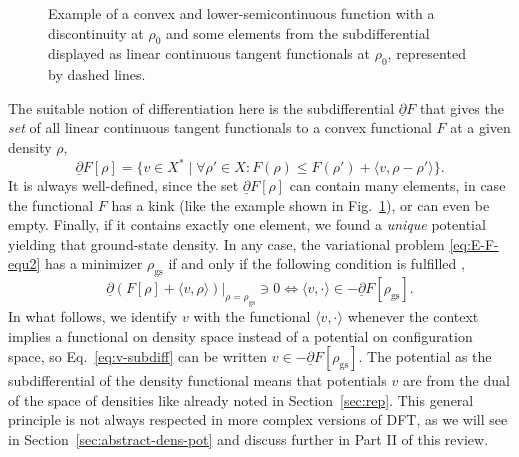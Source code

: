 \documentclass[journal=apcach,manuscript=article,layout=twocolumn]{achemso}
\newcommand{\rhogs}{{\rho_\mathrm{gs}}}
\begin{document}
\begin{figure}[ht]
\centering
{}
\caption{Example of a convex and lower-semicontinuous function with a discontinuity at $\rho_0$ and some elements from the subdifferential displayed as linear continuous tangent functionals at $\rho_0$, represented by dashed lines.}
\label{fig:subdiff}
\end{figure}

The suitable notion of differentiation here is the subdifferential $\underline\partial F$ that gives the \emph{set} of all linear continuous tangent functionals to a convex functional $F$ at a given density $\rho$,
\begin{equation*}
    \underline\partial F[\rho] = \{ v\in X^* \mid \forall \rho' \in X : F(\rho) \leq F(\rho')+ \langle v,\rho-\rho' \rangle \}.
\end{equation*}
%
It is always well-defined, since the set $\underline\partial F[\rho]$ can contain many elements, in case the functional $F$ has a kink (like the example shown in Fig.~\ref{fig:subdiff}), or can even be empty. Finally, if it contains exactly one element, we found a \emph{unique} potential yielding that ground-state density. In any case, the variational problem \eqref{eq:E-F-equ2} has a minimizer $\rhogs$ if and only if the following condition is fulfilled \cite[Proposition~2.33]{Barbu-Precupanu},
\begin{equation}\label{eq:v-subdiff}
    \left.\underline\partial(F[\rho] + \langle v,\rho \rangle)\right|_{\rho=\rhogs} \ni 0 \Longleftrightarrow \langle v,\cdot \rangle \in -\underline\partial F[\rhogs].
\end{equation}
%
In what follows, we identify $v$ with the functional $\langle v,\cdot \rangle$ whenever the context implies a functional on density space instead of a potential on configuration space, so Eq.~\eqref{eq:v-subdiff} can be written $v \in -\underline\partial F[\rhogs]$. The potential as the subdifferential of the density functional means that potentials $v$ are from the dual of the space of densities like already noted in Section~\ref{sec:rep}. This general principle is not always respected in more complex versions of DFT, as we will see in Section~\ref{sec:abstract-dens-pot} and discuss further in Part II of this review.
\end{document}
